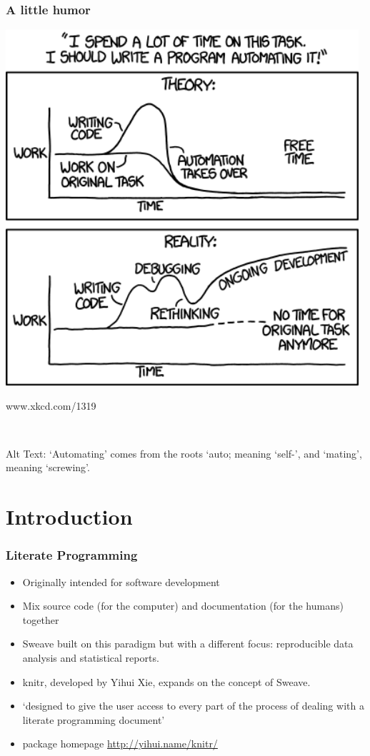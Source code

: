 \documentclass[t]{beamer}\usepackage[]{graphicx}\usepackage[]{color}
\begin{document}
\begin{frame}
  \frametitle{A little humor}
  \begin{minipage}[m]{0.48\textwidth}
    \includegraphics[width=0.98\textwidth]{figure/automation.png}
      \begin{center}
        www.xkcd.com/1319
      \end{center}
  \end{minipage}
  ~
  \begin{minipage}[m]{0.48\textwidth}
      
      Alt Text: `Automating' comes from the roots `auto; meaning `self-', and
      `mating', meaning `screwing'.
  \end{minipage} 
\end{frame}

\section{Introduction}
\begin{frame}[fragile] 
  \frametitle{Literate Programming}
  \begin{itemize}
    \item Originally intended for software development
    \item Mix source code (for the computer) and documentation (for the humans)
      together
    \item Sweave built on this paradigm but with a different focus:
      reproducible data analysis and statistical reports.
    \item knitr, developed by Yihui Xie, expands on the concept of Sweave.
    \item `designed to give the user access to every part of the process of
      dealing with a literate programming document'
    \item package homepage \url{http://yihui.name/knitr/}
  \end{itemize}
\end{frame}
\end{document}
